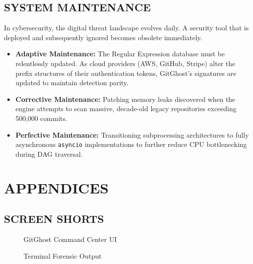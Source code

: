 \documentclass[12pt, a4paper, oneside]{report}
\begin{document}
\section{SYSTEM MAINTENANCE}
In cybersecurity, the digital threat landscape evolves daily. A security tool that is deployed and subsequently ignored becomes obsolete immediately.
\begin{itemize}
    \item \textbf{Adaptive Maintenance:} The Regular Expression database must be relentlessly updated. As cloud providers (AWS, GitHub, Stripe) alter the prefix structures of their authentication tokens, GitGhost’s signatures are updated to maintain detection parity.
    \item \textbf{Corrective Maintenance:} Patching memory leaks discovered when the engine attempts to scan massive, decade-old legacy repositories exceeding 500,000 commits.
    \item \textbf{Perfective Maintenance:} Transitioning subprocessing architectures to fully asynchronous \texttt{asyncio} implementations to further reduce CPU bottlenecking during DAG traversal.
\end{itemize}

\chapter{APPENDICES}

\section{SCREEN SHORTS}

\begin{figure}[H]
    \centering
    \caption{GitGhost Command Center UI}
\end{figure}

\begin{figure}[H]
    \centering
    \caption{Terminal Forensic Output}
\end{figure}
\end{document}
